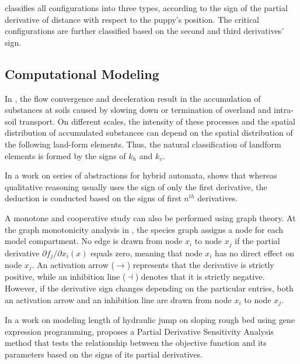 \documentclass[11pt]{book}
\begin{document}
\cite{abrahamsen2021chasing} classifies all configurations into three
types, according to the sign of the partial derivative of distance
with respect to the puppy's position. The critical configurations
are further classified based on the second and third derivatives'
sign.


\subsection{Computational Modeling}

In \cite{florinsky2000relationships}, the flow convergence and deceleration
result in the accumulation of substances at soils caused by slowing
down or termination of overland and intra-soil transport. On different
scales, the intensity of these processes and the spatial distribution
of accumulated substances can depend on the spatial distribution of
the following land-form elements. Thus, the natural classification
of landform elements is formed by the signs of $k_{h}$ and $k_{v}$.

In a work on series of abstractions for hybrid automata, \cite{tiwari2002series} shows that whereas qualitative reasoning usually
uses the sign of only the first derivative, the deduction is conducted
based on the signs of first $n^{th}$ derivatives.

A monotone and cooperative study can also be performed using graph
theory. At the graph monotonicity analysis in \cite{de2013computation},
the species graph assigns a node for each model compartment. No edge
is drawn from node $x_{i}$ to node $x_{j}$ if the partial derivative
$\partial f_{j}/\partial x_{i}(x)$ equals zero, meaning that node
$x_{i}$ has no direct effect on node $x_{j}$. An activation arrow
($\longrightarrow$) represents that the derivative is strictly positive,
while an inhibition line ($\dashv$) denotes that it is strictly negative.
However, if the derivative sign changes depending on the particular
entries, both an activation arrow and an inhibition line are drawn
from node $x_{i}$ to node $x_{j}$.

 In a work on modeling length of hydraulic jump on sloping rough bed using gene expression programming,\cite{pasandideh2020modeling} proposes a Partial Derivative Sensitivity Analysis method that tests the relationship between the objective function and its parameters based on the signs of its partial derivatives.

\end{document}
